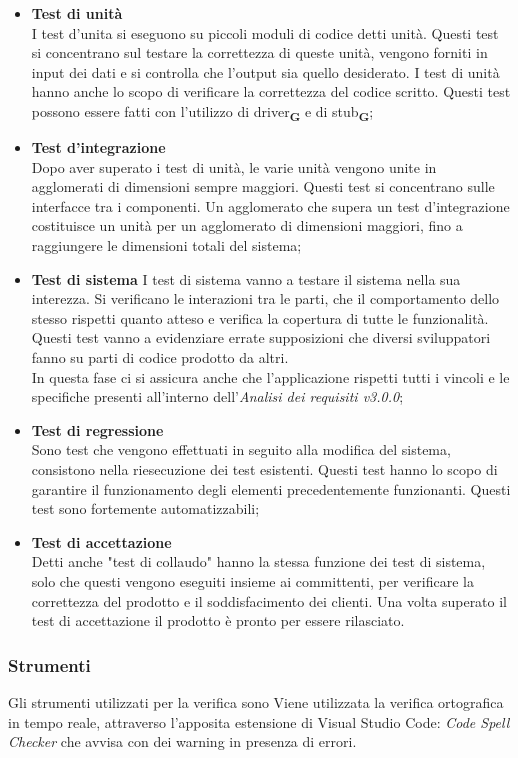 \begin{itemize}
    \item \textbf{Test di unità}\\
          I test d'unita si eseguono su piccoli moduli di codice detti unità. Questi test si concentrano sul testare la correttezza di queste unità, vengono forniti in input dei dati e si controlla che l'output sia quello desiderato. I test di unità hanno anche lo scopo di verificare la correttezza del codice scritto. Questi test possono essere fatti con l'utilizzo di driver\textsubscript{\textbf{G}} e di stub\textsubscript{\textbf{G}};
    \item \textbf{Test d'integrazione}\\
          Dopo aver superato i test di unità, le varie unità vengono unite in agglomerati di dimensioni sempre maggiori. Questi test si concentrano sulle interfacce tra i componenti. Un agglomerato che supera un test d'integrazione costituisce un unità per un agglomerato di dimensioni maggiori, fino a raggiungere le dimensioni totali del sistema;
    \item \textbf{Test di sistema}
          I test di sistema vanno a testare il sistema nella sua interezza. Si verificano le interazioni tra le parti, che il comportamento dello stesso rispetti quanto atteso e verifica la copertura di tutte le funzionalità. Questi test vanno a evidenziare errate supposizioni che diversi sviluppatori fanno su parti di codice prodotto da altri.\\
          In questa fase ci si assicura anche che l'applicazione rispetti tutti i vincoli e le specifiche presenti all'interno dell'\textit{Analisi dei requisiti v3.0.0};
    \item \textbf{Test di regressione}\\
          Sono test che vengono effettuati in seguito alla modifica del sistema, consistono nella riesecuzione dei test esistenti. Questi test hanno lo scopo di garantire il funzionamento degli elementi precedentemente funzionanti. Questi test sono fortemente automatizzabili;
    \item \textbf{Test di accettazione}\\
          Detti anche "test di collaudo" hanno la stessa funzione dei test di sistema, solo che questi vengono eseguiti insieme ai committenti, per verificare la correttezza del prodotto e il soddisfacimento dei clienti. Una volta superato il test di accettazione il prodotto è pronto per essere rilasciato.
\end{itemize}
\subsubsection{Strumenti}
Gli strumenti utilizzati per la verifica sono
Viene utilizzata la verifica ortografica in tempo reale, attraverso l'apposita estensione di Visual Studio Code: \textit{Code Spell Checker} che avvisa con dei warning in presenza di errori.

